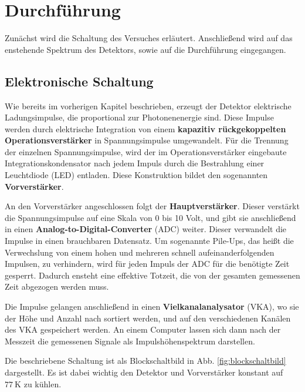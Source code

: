 \section{Durchführung}
\label{sec:Durchführung}

Zunächst wird die Schaltung des Versuches erläutert. Anschließend wird auf das
enstehende Spektrum des Detektors, sowie auf die Durchführung eingegangen.

\subsection{Elektronische Schaltung}

Wie bereits im vorherigen Kapitel beschrieben, erzeugt der Detektor elektrische
Ladungsimpulse, die proportional zur Photonenenergie sind. Diese Impulse werden durch
elektrische Integration von einem \textbf{kapazitiv rückgekoppelten Operationsverstärker}
in Spannungsimpulse umgewandelt. Für die Trennung der einzelnen Spannungsimpulse, wird
der im Operationsverstärker eingebaute Integrationskondensator nach jedem Impuls durch die
Bestrahlung einer Leuchtdiode (LED) entladen. Diese Konstruktion bildet den sogenannten \textbf{Vorverstärker}.

An den Vorverstärker angeschlossen folgt der \textbf{Hauptverstärker}.
Dieser verstärkt die Spannungsimpulse auf eine Skala von 0 bis 10 Volt, und
gibt sie anschließend in einen \textbf{Analog-to-Digital-Converter} (ADC) weiter.
Dieser verwandelt die Impulse in einen brauchbaren Datensatz. Um sogenannte Pile-Ups, das
heißt die Verwechslung von einem hohen und mehreren schnell aufeinanderfolgenden Impulsen,
zu verhindern, wird für jeden Impuls der ADC für die benötigte Zeit gesperrt. Dadurch
ensteht eine effektive Totzeit, die von der gesamten gemessenen Zeit abgezogen werden muss.

Die Impulse gelangen anschließend in einen \textbf{Vielkanalanalysator} (VKA), wo
sie der Höhe und Anzahl nach sortiert werden, und auf den verschiedenen Kanälen des VKA
gespeichert werden. An einem Computer lassen sich dann nach der Messzeit die gemessenen
Signale als Impulshöhenspektrum darstellen.

Die beschriebene Schaltung ist als Blockschaltbild in Abb. \ref{fig:blockschaltbild}
dargestellt. Es ist dabei wichtig den Detektor und Vorverstärker konstant auf $\SI{77}{\kelvin}$
zu kühlen.

